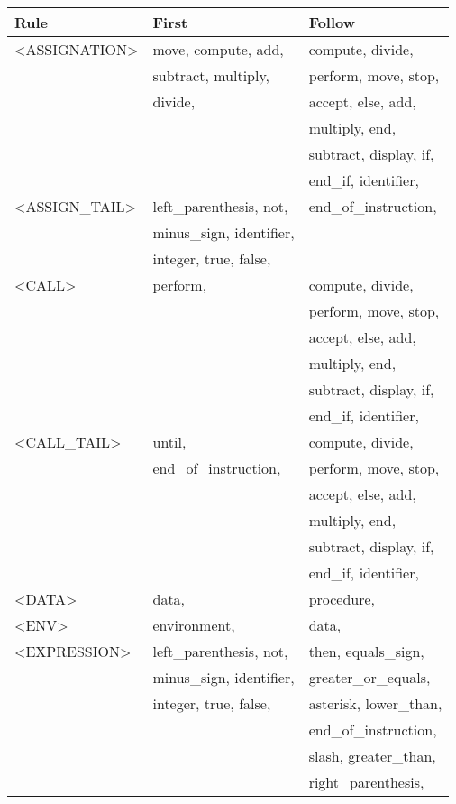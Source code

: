 \begin{longtable}{|l|l|l|}
\hline
Rule                 &   First                &   Follow               \\
\hline
<ASSIGNATION>  &  move, compute, add, &   compute, divide, \\ 
  &  subtract, multiply, &   perform, move, stop, \\ 
  &  divide, &   accept, else, add, \\ 
  &  &   multiply, end, \\ 
  &  &   subtract, display, if, \\ 
  &  &   end\_if, identifier, \\ 
  \hline
<ASSIGN\_TAIL>  &  left\_parenthesis, not, &   end\_of\_instruction, \\ 
  &  minus\_sign, identifier, &   \\ 
  &  integer, true, false, &   \\ 
  \hline
<CALL>  &  perform, &   compute, divide, \\ 
  &  &   perform, move, stop, \\ 
  &  &   accept, else, add, \\ 
  &  &   multiply, end, \\ 
  &  &   subtract, display, if, \\ 
  &  &   end\_if, identifier, \\ 
  \hline
<CALL\_TAIL>  &  until, &   compute, divide, \\ 
  &  end\_of\_instruction, &   perform, move, stop, \\ 
  &  &   accept, else, add, \\ 
  &  &   multiply, end, \\ 
  &  &   subtract, display, if, \\ 
  &  &   end\_if, identifier, \\ 
  \hline
<DATA>  &  data, &   procedure, \\ 
  \hline
<ENV>  &  environment, &   data, \\ 
  \hline
<EXPRESSION>  &  left\_parenthesis, not, &   then, equals\_sign, \\ 
  &  minus\_sign, identifier, &   greater\_or\_equals, \\ 
  &  integer, true, false, &   asterisk, lower\_than, \\ 
  &  &   end\_of\_instruction, \\ 
  &  &   slash, greater\_than, \\ 
  &  &   right\_parenthesis, \\ 

\end{longtable}
